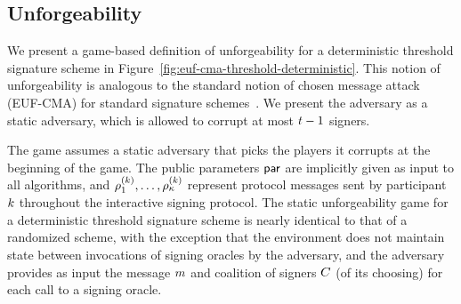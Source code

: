 %






\subsection{Unforgeability}
%
We present a game-based definition of unforgeability for a deterministic threshold signature scheme in
Figure~\ref{fig:euf-cma-threshold-deterministic}.
This notion of unforgeability is analogous to the standard notion of chosen message attack (EUF-CMA) for standard signature schemes~\cite{GoldwasserMR88}.
We present the adversary as a static adversary,
which is allowed to corrupt at most $t-1$ signers.

The game assumes a static adversary that picks the players it corrupts at the beginning of the game.
The public parameters $\mathsf{par}$ are implicitly given as input to all algorithms,
and $\rho^{(k)}_1, \ldots, \rho^{(k)}_\kappa$ represent protocol messages
sent by participant $k$ throughout the interactive signing protocol.
%
The static unforgeability game for a deterministic threshold signature scheme is nearly identical to that of a randomized scheme,
with the exception that the environment does not maintain state between invocations of signing oracles by the adversary,
and the adversary provides as input the message $m$ and coalition of signers $C$ (of its choosing) for each call to a signing oracle.

